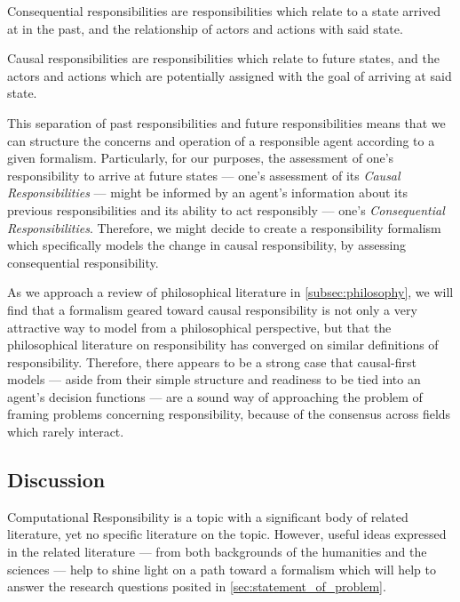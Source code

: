 \begin{displayquote}
    Consequential responsibilities are responsibilities which relate to a state arrived at in the past, and the relationship of actors and actions with said state.
\end{displayquote}\par

\begin{displayquote}
    Causal responsibilities are responsibilities which relate to future states, and the actors and actions which are potentially assigned with the goal of arriving at said state.
\end{displayquote}

This separation of past responsibilities and future responsibilities means that we can structure the concerns and operation of a responsible agent according to a given formalism. Particularly, for our purposes, the assessment of one's responsibility to arrive at future states --- one's assessment of its \emph{Causal Responsibilities} --- might be informed by an agent's information about its previous responsibilities and its ability to act responsibly --- one's \emph{Consequential Responsibilities}. Therefore, we might decide to create a responsibility formalism which specifically models the change in causal responsibility, by assessing consequential responsibility.\par

As we approach a review of philosophical literature in \cref{subsec:philosophy}, we will find that a formalism geared toward causal responsibility is not only a very attractive way to model from a philosophical perspective, but that the philosophical literature on responsibility has converged on similar definitions of responsibility. Therefore, there appears to be a strong case that causal-first models --- aside from their simple structure and readiness to be tied into an agent's decision functions --- are a sound way of approaching the problem of framing problems concerning responsibility,  because of the consensus across fields which rarely interact.


\subsection{Discussion}
Computational Responsibility is a topic with a significant body of related literature, yet no specific literature on the topic. However, useful ideas expressed in the related literature --- from both backgrounds of the humanities and the sciences --- help to shine light on a path toward a formalism which will help to answer the research questions posited in \cref{sec:statement_of_problem}.\par

